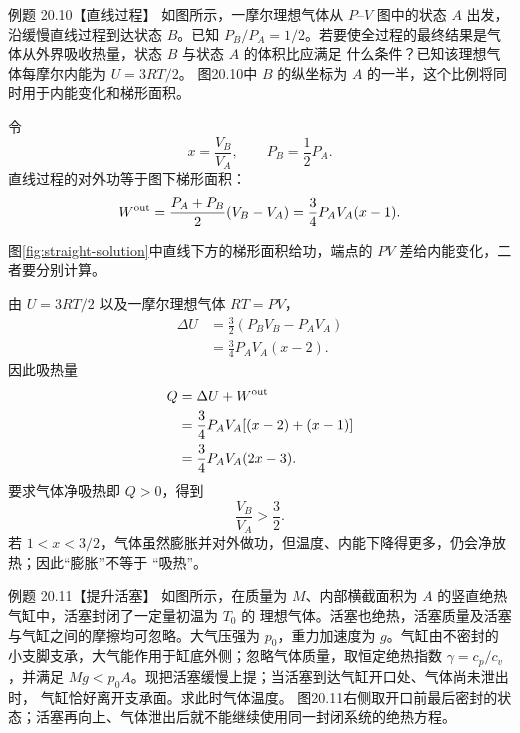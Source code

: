 \begin{origexamplebox}{例题 20.10【直线过程】}
如图所示，一摩尔理想气体从 $P$--$V$ 图中的状态 $A$ 出发，沿缓慢直线过程到达状态 $B$。已知
$P_B/P_A=1/2$。若要使全过程的最终结果是气体从外界吸收热量，状态 $B$ 与状态 $A$ 的体积比应满足
什么条件？已知该理想气体每摩尔内能为 $U=3RT/2$。
\straightQuestionRedraw
{}
图20.10中 $B$ 的纵坐标为 $A$ 的一半，这个比例将同时用于内能变化和梯形面积。
\end{origexamplebox}

\begin{xesolution}
令
\begin{equation*}
  x=\frac{V_B}{V_A},
  \qquad P_B=\frac12P_A.
\end{equation*}
直线过程的对外功等于图下梯形面积：
\begin{equation*}
  W^{\rm out}
  =\frac{P_A+P_B}{2}(V_B-V_A)
  =\frac34P_AV_A(x-1).
\end{equation*}

\straightProcessDiagram
{}\label{fig:straight-solution}
图\ref{fig:straight-solution}中直线下方的梯形面积给功，端点的 $PV$ 差给内能变化，二者要分别计算。

由 $U=3RT/2$ 以及一摩尔理想气体 $RT=PV$，
\begin{align*}
  \Delta U
  &=\frac32(P_BV_B-P_AV_A)\\
  &=\frac34P_AV_A(x-2).
\end{align*}
因此吸热量
\begin{align*}
  Q&=\Delta U+W^{\rm out}\\
   &=\frac34P_AV_A[(x-2)+(x-1)]\\
   &=\frac34P_AV_A(2x-3).
\end{align*}
要求气体净吸热即 $Q>0$，得到
\begin{equation}
  \boxed{\frac{V_B}{V_A}>\frac32}.
\end{equation}
若 $1<x<3/2$，气体虽然膨胀并对外做功，但温度、内能下降得更多，仍会净放热；因此“膨胀”不等于
“吸热”。
\end{xesolution}

\begin{origexamplebox}{例题 20.11【提升活塞】}
如图所示，在质量为 $M$、内部横截面积为 $A$ 的竖直绝热气缸中，活塞封闭了一定量初温为 $T_0$ 的
理想气体。活塞也绝热，活塞质量及活塞与气缸之间的摩擦均可忽略。大气压强为 $p_0$，重力加速度为
$g$。气缸由不密封的小支脚支承，大气能作用于缸底外侧；忽略气体质量，取恒定绝热指数
$\gamma=c_p/c_v$，并满足 $Mg<p_0A$。现把活塞缓慢上提；当活塞到达气缸开口处、气体尚未泄出时，
气缸恰好离开支承面。求此时气体温度。
\liftingPistonQuestionRedraw
{}
图20.11右侧取开口前最后密封的状态；活塞再向上、气体泄出后就不能继续使用同一封闭系统的绝热方程。
\end{origexamplebox}


